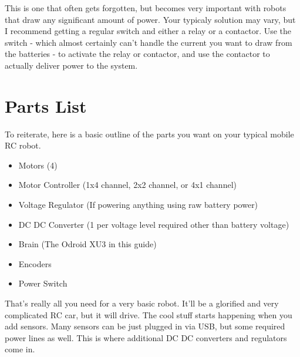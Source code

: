 This is one that often gets forgotten, but becomes very important with robots that draw any significant amount of power. Your typicaly solution may vary, but I recommend getting a regular switch and either a relay or a contactor. Use the switch - which almost certainly can't handle the current you want to draw from the batteries - to activate the relay or contactor, and use the contactor to actually deliver power to the system.

\section{Parts List}

To reiterate, here is a basic outline of the parts you want on your typical mobile RC robot.

\begin{itemize}
  \item{Motors (4)}
  \item{Motor Controller (1x4 channel, 2x2 channel, or 4x1 channel)}
  \item{Voltage Regulator (If powering anything using raw battery power)}
  \item{DC DC Converter (1 per voltage level required other than battery voltage)}
  \item{Brain (The Odroid XU3 in this guide)}
  \item{Encoders}
  \item{Power Switch}
\end{itemize}

That's really all you need for a very basic robot. It'll be a glorified and very complicated RC car, but it will drive. The cool stuff starts happening when you add sensors. Many sensors can be just plugged in via USB, but some required power lines as well. This is where additional DC DC converters and regulators come in.
